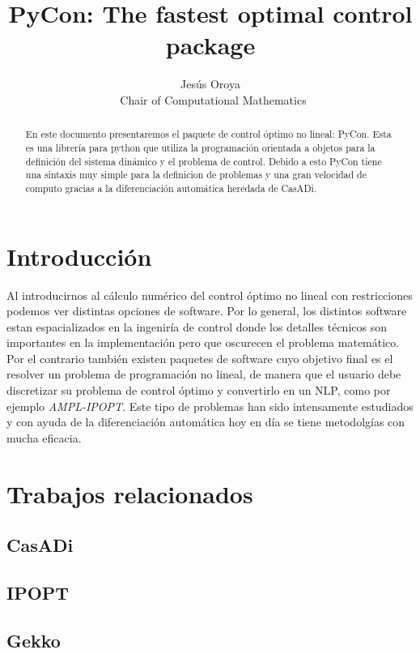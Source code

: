 \documentclass[]{article}
\title{PyCon: The fastest optimal control package}
\author{Jesús Oroya \\ Chair of Computational Mathematics}
\begin{document}
\maketitle    

\begin{abstract}
    En este documento presentaremos el paquete de control óptimo no lineal: PyCon. 
    Esta es una librería para python que utiliza la programación orientada a objetos para la definición del sistema dinámico y el problema de control.
    Debido a esto PyCon tiene una sintaxis muy simple para la definicion de problemas y una gran velocidad de computo gracias a la diferenciación automática heredada de CasADi.

\end{abstract}
\tableofcontents
\section{Introducción}

Al introducirnos al cálculo numérico del control óptimo no lineal con restricciones podemos ver distintas opciones de software. Por lo general, los distintos software estan espacializados en la ingeniría de control donde los detalles técnicos son importantes en la implementación pero que oscurecen el problema matemático. Por el contrario también existen paquetes de software cuyo objetivo final es el resolver un problema de programación no lineal, de manera que el usuario debe discretizar su problema de control óptimo y convertirlo en un NLP, como por ejemplo \emph{AMPL-IPOPT}. Este tipo de problemas han sido intensamente estudiados y con ayuda de la diferenciación automática hoy en día se tiene metodolgías con mucha eficacia. 


 
\section{Trabajos relacionados}
\subsection{CasADi}
\subsection{IPOPT}
\subsection{Gekko}
\end{document}
